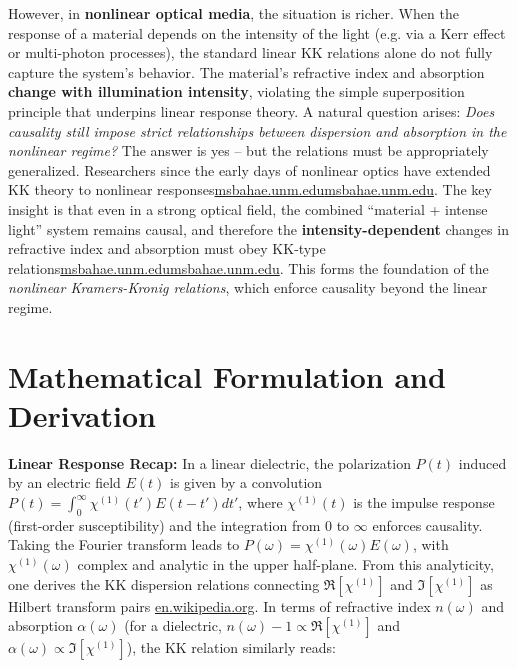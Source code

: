 \documentclass[11pt,a4paper]{article}
\begin{document}
However, in \textbf{nonlinear optical media}, the situation is richer. When the response of a material depends on the intensity of the light (e.g. via a Kerr effect or multi-photon processes), the standard linear KK relations alone do not fully capture the system’s behavior. The material’s refractive index and absorption \textbf{change with illumination intensity}, violating the simple superposition principle that underpins linear response theory. A natural question arises: \emph{Does causality still impose strict relationships between dispersion and absorption in the nonlinear regime?} The answer is yes – but the relations must be appropriately generalized. Researchers since the early days of nonlinear optics have extended KK theory to nonlinear responses\href{https://msbahae.unm.edu/Courses/568%20Nonlinear%20Optics/OSA-Handbook%20of%20Optics-IV-Ch17.pdf#:~:text=take%3F The Kramers,that one can linearize the}{msbahae.unm.edu}\href{https://msbahae.unm.edu/Courses/568%20Nonlinear%20Optics/OSA-Handbook%20of%20Optics-IV-Ch17.pdf#:~:text=recently%2C however ,It is}{msbahae.unm.edu}. The key insight is that even in a strong optical field, the combined “material + intense light” system remains causal, and therefore the \textbf{intensity-dependent} changes in refractive index and absorption must obey KK-type relations\href{https://msbahae.unm.edu/Courses/568%20Nonlinear%20Optics/OSA-Handbook%20of%20Optics-IV-Ch17.pdf#:~:text=recently%2C however ,It is}{msbahae.unm.edu}\href{https://msbahae.unm.edu/Courses/568%20Nonlinear%20Optics/OSA-Handbook%20of%20Optics-IV-Ch17.pdf#:~:text=the fact that our new,∞ −∞ − %2B ∆}{msbahae.unm.edu}. This forms the foundation of the \emph{nonlinear Kramers-Kronig relations}, which enforce causality beyond the linear regime.

\section{Mathematical Formulation and Derivation}

\textbf{Linear Response Recap:} In a linear dielectric, the polarization $P(t)$ induced by an electric field $E(t)$ is given by a convolution $P(t)=\int_{0}^{\infty}\chi^{(1)}(t')E(t-t')dt'$, where $\chi^{(1)}(t)$ is the impulse response (first-order susceptibility) and the integration from $0$ to $\infty$ enforces causality. Taking the Fourier transform leads to $P(\omega)=\chi^{(1)}(\omega)E(\omega)$, with $\chi^{(1)}(\omega)$ complex and analytic in the upper half-plane. From this analyticity, one derives the KK dispersion relations connecting $\Re[\chi^{(1)}]$ and $\Im[\chi^{(1)}]$ as Hilbert transform pairs \href{https://en.wikipedia.org/wiki/Kramers%E2%80%93Kronig_relations}{en.wikipedia.org}. In terms of refractive index $n(\omega)$ and absorption $\alpha(\omega)$ (for a dielectric, $n(\omega)-1 \propto \Re[\chi^{(1)}]$ and $\alpha(\omega)\propto \Im[\chi^{(1)}]$), the KK relation similarly reads:
\end{document}
